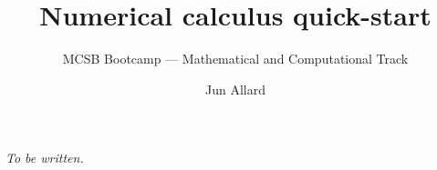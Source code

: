 \documentclass[
  letterpaper,
  DIV=11,
  numbers=noendperiod]{scrartcl}
\title{Numerical calculus quick-start}
\subtitle{MCSB Bootcamp --- Mathematical and Computational Track}
\author{Jun Allard}
\date{}
\begin{document}
\maketitle


\emph{To be written.}
\end{document}
